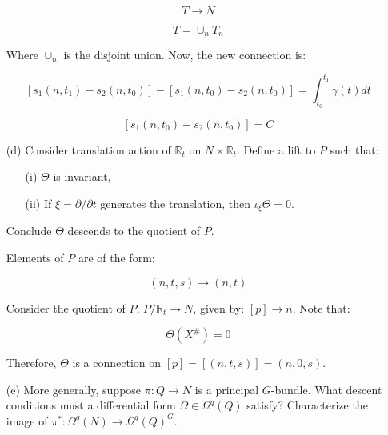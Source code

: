 \begin{enumerate}
    $$T \to N$$

    $$T = \cup_{n} T_{n}$$

    Where $\cup_{n}$ is the disjoint union. Now, the new connection is:

    $$\left[s_{1}(n, t_{1}) - s_{2}(n, t_{0}) \right] - \left[s_{1}(n, t_{0}) - s_{2}(n, t_{0}) \right]= \int_{t_{0}}^{t_{1}} \gamma(t) dt $$

    $$\left[s_{1}(n, t_{0}) - s_{2}(n, t_{0}) \right] = C$$


    \item[(d)] Consider translation action of $\mathbb{R}_t$ on $N \times \mathbb{R}_t$. Define a lift to $P$ such that:
    \begin{itemize}
        \item[(i)] $\Theta$ is invariant,
        \item[(ii)] If $\xi = \partial/\partial t$ generates the translation, then $\iota_\xi \Theta = 0$.
    \end{itemize}
    Conclude $\Theta$ descends to the quotient of $P$.

    Elements of $P$ are of the form:

    $$(n, t, s) \to (n, t)$$

    Consider the quotient of $P$, $P/\mathbb{R}_{t} \to N$, given by: $[p] \to n$. Note that:

    $$\Theta(X^{\#}) = 0$$

    Therefore, $\Theta$ is a connection on $[p] = [(n, t, s)] = (n, 0, s)$. 

    \item[(e)] More generally, suppose $\pi: Q \to N$ is a principal $G$-bundle. What descent conditions must a differential form $\Omega \in \Omega^q(Q)$ satisfy? Characterize the image of $\pi^*: \Omega^q(N) \to \Omega^q(Q)^G$.



\end{enumerate}

